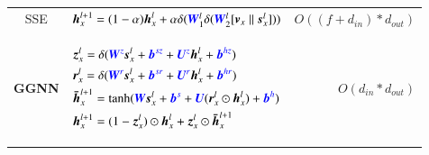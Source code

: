 \begin{table}[H]
\begin{footnotesize}
\begin{tabular}{clr}
            SSE             \cite{han2018_sse}                                                                                                                                                                               &
            $\boldsymbol{h}_x^{l+1} = (1 - \alpha)  \boldsymbol{h}_x^l +\alpha    \delta(\textcolor{blue}{\boldsymbol{W}}^l_1 \delta(\textcolor{blue}{\boldsymbol{W}}^l_2 [\boldsymbol{v}_x \parallel \boldsymbol{s}_x^l]))$ &
            $O((f + d_{in}) * d_{out})$                                                                                                                                                                                        \\
            \textbf{GGNN}    \cite{li2015_ggnn}                                                                                                                                                                              &
            \begin{scriptsize}
                $\begin{aligned}[t]
                         & {\boldsymbol{z}}_x^l = \delta ( \textcolor{blue}{\boldsymbol{W}^z} \boldsymbol{s}_x^l + \textcolor{blue}{\boldsymbol{b}^{sz}} + \textcolor{blue}{\boldsymbol{U}^z} \boldsymbol{h}_x^{l} + \textcolor{blue}{\boldsymbol{b}^{hz}})                    \\
                         & \boldsymbol{r}_x^l = \delta ( \textcolor{blue}{\boldsymbol{W}^r} \boldsymbol{s}_x^l+ \textcolor{blue}{\boldsymbol{b}^{sr}} +\textcolor{blue}{\boldsymbol{U}^r} \boldsymbol{h}_x^{l} + \textcolor{blue}{\boldsymbol{b}^{hr}})                        \\
                         & \boldsymbol{\bar{h}}_x^{l+1} = \tanh ( \textcolor{blue}{\boldsymbol{W}} \boldsymbol{s}_x^l + \textcolor{blue}{\boldsymbol{b}^s} + \textcolor{blue}{\boldsymbol{U}} ( \boldsymbol{r}_x^l \odot \boldsymbol{h}_x^{l}) + \textcolor{blue}{\boldsymbol{b}^h}) \\
                         & \boldsymbol{h}_x^{l+1} = (1 - {\boldsymbol{z}}_x^l) \odot \boldsymbol{h}_x^l + {\boldsymbol{z}}_x^l \odot \boldsymbol{\bar{h}}_x^{l+1}
                    \end{aligned}$
            \end{scriptsize}
                                                                                                                                                                                                                             &
            $O(d_{in} * d_{out})$                                                                                                                                                                                              \\

\end{tabular}
\end{footnotesize}
\end{table}
